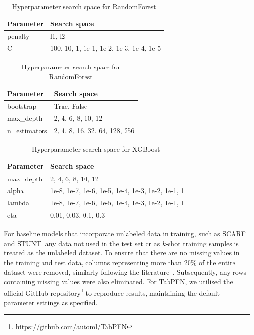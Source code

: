 \documentclass{article}
\theoremstyle{plain}
\theoremstyle{definition}
\theoremstyle{remark}
\begin{document}
\begin{table}[h!]
\centering
\parbox{.45\linewidth}{
\centering
\begin{tabular}{@{}l|l@{}}
\toprule
Parameter & Search space \\ \midrule
penalty & l1, l2 \\
C & 100, 10, 1, 1e-1, 1e-2, 1e-3, 1e-4, 1e-5 \\ \bottomrule
\end{tabular}
\label{tab:appendix-logreg}
\caption{Hyperparameter search space for LogReg}}
\parbox{.50\linewidth}{
\centering
\begin{tabular}{@{}l|l@{}}
\toprule
Parameter & Search space \\ \midrule
bootstrap & True, False \\
max\_depth & 2, 4, 6, 8, 10, 12 \\
n\_estimators & 2, 4, 8, 16, 32, 64, 128, 256 \\ \bottomrule
\end{tabular}
\caption{Hyperparameter search space for RandomForest}}
\end{table}


\begin{table}[h!]
\centering
\begin{tabular}{@{}l|l@{}}
\toprule
Parameter & Search space \\ \midrule
max\_depth & 2, 4, 6, 8, 10, 12 \\
alpha & 1e-8, 1e-7, 1e-6, 1e-5, 1e-4, 1e-3, 1e-2, 1e-1, 1 \\
lambda & 1e-8, 1e-7, 1e-6, 1e-5, 1e-4, 1e-3, 1e-2, 1e-1, 1 \\
eta & 0.01, 0.03, 0.1, 0.3 \\ \bottomrule
\end{tabular}
\caption{Hyperparameter search space for XGBoost}
\end{table}

For baseline models that incorporate unlabeled data in training, such as SCARF and STUNT, any data not used in the test set or as $k$-shot training samples is treated as the unlabeled dataset. To ensure that there are no missing values in the training and test data, columns representing more than 20\% of the entire dataset were removed, similarly following the literature~\cite{kang2013prevention,jakobsen2017and}. Subsequently, any rows containing missing values were also eliminated. 
For TabPFN, we utilized the official GitHub repository\footnote{https://github.com/automl/TabPFN} to reproduce results, maintaining the default parameter settings as specified.
\end{document}
